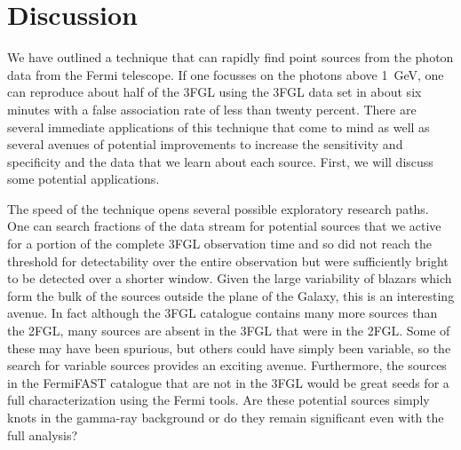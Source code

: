 \documentclass[useAMS,usenatbib]{mn2e}
\begin{document}
\section{Discussion}
\label{sec:discussion}

We have outlined a technique that can rapidly find point sources from
the photon data from the Fermi telescope.  If one focusses on the
photons above 1~GeV, one can reproduce about half of the 3FGL using
the 3FGL data set in about six minutes with a false association rate of
less than twenty percent.  There are several immediate applications of
this technique that come to mind as well as several avenues of
potential improvements to increase the sensitivity and specificity
and the data that we learn about each source.  First, we will discuss
some potential applications.

The speed of the technique opens several possible exploratory research
paths.  One can search fractions of the data stream for potential
sources that we active for a portion of the complete 3FGL observation
time and so did not reach the threshold for detectability over the
entire observation but were sufficiently bright to be detected over a
shorter window.  Given the large variability of blazars which form the
bulk of the sources outside the plane of the Galaxy, this is an
interesting avenue.  In fact although the 3FGL catalogue contains many
more sources than the 2FGL, many sources are absent in the 3FGL that
were in the 2FGL.  Some of these may have been spurious, but others
could have simply been variable, so the search for variable sources
provides an exciting avenue.  Furthermore, the sources in the
FermiFAST catalogue that are not in the 3FGL would be great seeds for
a full characterization using the Fermi tools.  Are these potential
sources simply knots in the gamma-ray background or do they remain
significant even with the full analysis?
\end{document}
